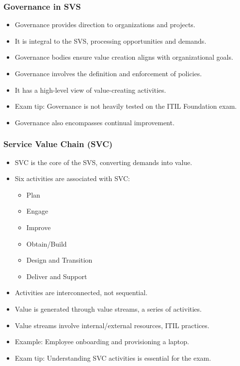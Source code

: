 \documentclass[aspectratio=169, table]{beamer}
\begin{document}
\begin{frame}
	\frametitle{Governance in SVS}
	\begin{itemize}
		\item Governance provides direction to organizations and projects.
		\item It is integral to the SVS, processing opportunities and demands.
		\item Governance bodies ensure value creation aligns with organizational goals.
		\item Governance involves the definition and enforcement of policies.
		\item It has a high-level view of value-creating activities.
		\item Exam tip: Governance is not heavily tested on the ITIL Foundation exam.
		\item Governance also encompasses continual improvement.
	\end{itemize}
\end{frame}

\begin{frame}
	\frametitle{Service Value Chain (SVC)}
	\begin{itemize}
		\item SVC is the core of the SVS, converting demands into value.
		\item Six activities are associated with SVC:
		\begin{itemize}
			\item Plan
			\item Engage
			\item Improve
			\item Obtain/Build
			\item Design and Transition
			\item Deliver and Support
		\end{itemize}
		\item Activities are interconnected, not sequential.
		\item Value is generated through value streams, a series of activities.
		\item Value streams involve internal/external resources, ITIL practices.
		\item Example: Employee onboarding and provisioning a laptop.
		\item Exam tip: Understanding SVC activities is essential for the exam.
	\end{itemize}
\end{frame}
\end{document}
